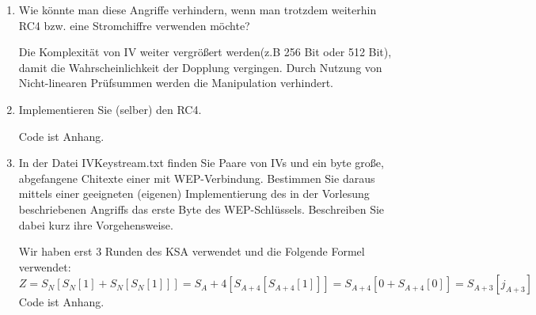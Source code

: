 \documentclass[12pt,a4paper]{article}
\newenvironment{exercise}
	{\begin{enumerate}[label=\bfseries\alph*).]\bfseries}
{\end{enumerate}}
\newenvironment{answer}{\par\normalfont}{}
\begin{document}
\begin{exercise}
\begin{answer}
		Ein Angreifer kann eine beliebige Nachricht wählen, die CRC-Prüfsumme dazu bilden,
		das Ganze mit dem bekannten Schlüsselstrom XOR-verknüpfen und den passenden
		IV dahinter anfügen.\\
		Ein Angreifer kann auch gezielt die Bits der IP-Zieladresse so abändern, dass das Paket in ein vom Angreifer kontrolliertes Netzwerk umgeleitet wird. Er kann dann die andere Headerfeld so abändern, dass die Prüfsumme gleich beleibt. AP wird die Paket dann entschlüsselt und umleitet.
		\end{answer}
		\item  Wie könnte man diese Angriffe verhindern, wenn man trotzdem weiterhin RC4 bzw. eine Stromchiffre verwenden möchte?
		\begin{answer}
		Die Komplexität von IV weiter vergrößert werden(z.B 256 Bit oder 512 Bit), damit die Wahrscheinlichkeit der Dopplung vergingen.
		Durch Nutzung von Nicht-linearen Prüfsummen werden die Manipulation verhindert.
		 
		\end{answer}
		\item Implementieren Sie (selber) den RC4.
		\begin{answer}
					Code ist Anhang.
		\end{answer}
		\item In der Datei IVKeystream.txt finden Sie Paare von IVs und ein byte große, abgefangene Chitexte einer mit WEP-Verbindung. Bestimmen Sie daraus mittels einer geeigneten (eigenen) Implementierung des in der Vorlesung beschriebenen Angriffs das erste Byte des WEP-Schlüssels. Beschreiben Sie dabei kurz ihre Vorgehensweise.
		\begin{answer}
		Wir haben erst 3 Runden des KSA verwendet und die Folgende Formel verwendet:
		\[Z=S_N[S_N[1]+S_N[S_N[1]]]=S_A+4[S_{A+4}[S_{A+4}[1]]]=S_{A+4}[0+S_{A+4}[0]]=S_{A+3}[j_{A+3}]\]
		Code ist Anhang.
		\end{answer}
    	\end{exercise}
    
\end{document}
